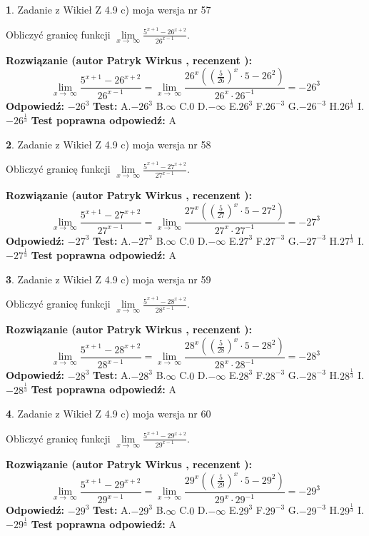 \documentclass[12pt, a4paper]{article}
\theoremstyle{definition} %
\newtheorem{zad}{}
\newcommand{\zadStart}[1]{\begin{zad}#1\newline}
\newcommand{\zadStop}{\end{zad}}
\newcommand{\rozwStart}[2]{\noindent \textbf{Rozwiązanie (autor #1 , recenzent #2): }\newline}
\newcommand{\rozwStop}{\newline}
\newcommand{\odpStart}{\noindent \textbf{Odpowiedź:}\newline}
\newcommand{\odpStop}{\newline}
\newcommand{\testStart}{\noindent \textbf{Test:}\newline}
\newcommand{\testStop}{\newline}
\newcommand{\kluczStart}{\noindent \textbf{Test poprawna odpowiedź:}\newline}
\newcommand{\kluczStop}{\newline}
\begin{document}
\zadStart{Zadanie z Wikieł Z 4.9 c) moja wersja nr 57}


Obliczyć granicę funkcji  $\lim\limits_{x\to\ \infty}\frac{5^{x+1}-26^{x+2}}{26^{x-1}}$.
\zadStop
\rozwStart{Patryk Wirkus}{}
$$\lim\limits_{x\to\ \infty}\frac{5^{x+1}-26^{x+2}}{26^{x-1}}=\lim\limits_{x\to\ \infty}\frac{26^{x}((\frac{5}{26})^{x}\cdot 5 -26^{2})}{26^{x}\cdot 26^{-1}} = -26^{3}$$
\rozwStop
\odpStart
$-26^{3}$
\odpStop
\testStart
A.$-26^{3}$ B.$\infty$ C.$0$ D.$-\infty$ E.$26^{3}$
F.$26^{-3}$ G.$-26^{-3}$
H.$26^{\frac{1}{3}}$
I.$-26^{\frac{1}{3}}$
\testStop
\kluczStart
A
\kluczStop



\zadStart{Zadanie z Wikieł Z 4.9 c) moja wersja nr 58}


Obliczyć granicę funkcji  $\lim\limits_{x\to\ \infty}\frac{5^{x+1}-27^{x+2}}{27^{x-1}}$.
\zadStop
\rozwStart{Patryk Wirkus}{}
$$\lim\limits_{x\to\ \infty}\frac{5^{x+1}-27^{x+2}}{27^{x-1}}=\lim\limits_{x\to\ \infty}\frac{27^{x}((\frac{5}{27})^{x}\cdot 5 -27^{2})}{27^{x}\cdot 27^{-1}} = -27^{3}$$
\rozwStop
\odpStart
$-27^{3}$
\odpStop
\testStart
A.$-27^{3}$ B.$\infty$ C.$0$ D.$-\infty$ E.$27^{3}$
F.$27^{-3}$ G.$-27^{-3}$
H.$27^{\frac{1}{3}}$
I.$-27^{\frac{1}{3}}$
\testStop
\kluczStart
A
\kluczStop



\zadStart{Zadanie z Wikieł Z 4.9 c) moja wersja nr 59}


Obliczyć granicę funkcji  $\lim\limits_{x\to\ \infty}\frac{5^{x+1}-28^{x+2}}{28^{x-1}}$.
\zadStop
\rozwStart{Patryk Wirkus}{}
$$\lim\limits_{x\to\ \infty}\frac{5^{x+1}-28^{x+2}}{28^{x-1}}=\lim\limits_{x\to\ \infty}\frac{28^{x}((\frac{5}{28})^{x}\cdot 5 -28^{2})}{28^{x}\cdot 28^{-1}} = -28^{3}$$
\rozwStop
\odpStart
$-28^{3}$
\odpStop
\testStart
A.$-28^{3}$ B.$\infty$ C.$0$ D.$-\infty$ E.$28^{3}$
F.$28^{-3}$ G.$-28^{-3}$
H.$28^{\frac{1}{3}}$
I.$-28^{\frac{1}{3}}$
\testStop
\kluczStart
A
\kluczStop



\zadStart{Zadanie z Wikieł Z 4.9 c) moja wersja nr 60}


Obliczyć granicę funkcji  $\lim\limits_{x\to\ \infty}\frac{5^{x+1}-29^{x+2}}{29^{x-1}}$.
\zadStop
\rozwStart{Patryk Wirkus}{}
$$\lim\limits_{x\to\ \infty}\frac{5^{x+1}-29^{x+2}}{29^{x-1}}=\lim\limits_{x\to\ \infty}\frac{29^{x}((\frac{5}{29})^{x}\cdot 5 -29^{2})}{29^{x}\cdot 29^{-1}} = -29^{3}$$
\rozwStop
\odpStart
$-29^{3}$
\odpStop
\testStart
A.$-29^{3}$ B.$\infty$ C.$0$ D.$-\infty$ E.$29^{3}$
F.$29^{-3}$ G.$-29^{-3}$
H.$29^{\frac{1}{3}}$
I.$-29^{\frac{1}{3}}$
\testStop
\kluczStart
A
\kluczStop
\end{document}
